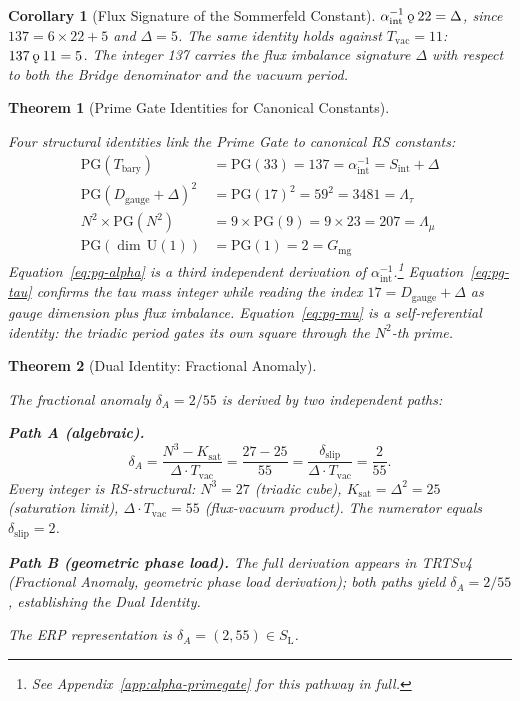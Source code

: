 \documentclass[11pt, letterpaper]{article}
\newcommand{\SL}{S_{\mathrm{L}}}
\newcommand{\koppa}{\mathbin{\text{\rm\k{o}}}}
\newcommand{\Dg}{D_{\mathrm{gauge}}}
\newcommand{\Sint}{S_{\mathrm{int}}}
\newcommand{\PG}{\mathrm{PG}}
\theoremstyle{definition}
\theoremstyle{plain}
\newtheorem{theorem}{Theorem}[section]
\newtheorem{corollary}{Corollary}[section]
\begin{document}
\begin{corollary}[Flux Signature of the Sommerfeld Constant]
\label{cor:flux-sig}
$\alpha^{-1}_{\mathrm{int}} \koppa 22 = \Delta$, since $137=6\times 22+5$ and $\Delta=5$. The same identity holds against $T_{\mathrm{vac}}=11$: $137 \koppa 11 = 5$. The integer 137 carries the flux imbalance signature $\Delta$ with respect to both the Bridge denominator and the vacuum period.
\end{corollary}

\begin{theorem}[Prime Gate Identities for Canonical Constants]
\label{thm:pg-identities}
\begin{rsbox}
Four structural identities link the Prime Gate to canonical RS constants:
\begin{align}
\PG(T_{\mathrm{bary}}) &= \PG(33) = 137
  = \alpha^{-1}_{\mathrm{int}} = \Sint+\Delta
  \label{eq:pg-alpha}\\[4pt]
\PG(\Dg+\Delta)^2 &= \PG(17)^2 = 59^2 = 3481
  = \Lambda_\tau
  \label{eq:pg-tau}\\[4pt]
N^2\times\PG(N^2) &= 9\times\PG(9) = 9\times 23 = 207
  = \Lambda_\mu
  \label{eq:pg-mu}\\[4pt]
\PG(\dim\,\mathrm{U}(1)) &= \PG(1) = 2 = G_{\mathrm{mg}}
  \label{eq:pg-mg}
\end{align}
Equation~\eqref{eq:pg-alpha} is a third independent derivation of
$\alpha^{-1}_{\mathrm{int}}$.\footnote{See Appendix~\ref{app:alpha-primegate}
for this pathway in full.}  Equation~\eqref{eq:pg-tau} confirms the tau mass
integer while reading the index $17=\Dg+\Delta$ as gauge dimension plus flux
imbalance.  Equation~\eqref{eq:pg-mu} is a self-referential identity: the
triadic period gates its own square through the $N^2$-th prime.
\end{rsbox}
\end{theorem}

\begin{theorem}[Dual Identity: Fractional Anomaly]\label{thm:dual-anomaly}
\begin{rsbox}
The fractional anomaly $\delta_A=2/55$ is derived by two independent paths:

\textbf{Path A (algebraic).}
\[
\delta_A = \frac{N^3-K_{\mathrm{sat}}}{\Delta\cdot T_{\mathrm{vac}}}
         = \frac{27-25}{55}
         = \frac{\delta_{\mathrm{slip}}}{\Delta\cdot T_{\mathrm{vac}}}
         = \frac{2}{55}.
\]
Every integer is RS-structural: $N^3=27$ (triadic cube),
$K_{\mathrm{sat}}=\Delta^2=25$ (saturation limit),
$\Delta\cdot T_{\mathrm{vac}}=55$ (flux-vacuum product).
The numerator equals $\delta_{\mathrm{slip}}=2$.

\textbf{Path B (geometric phase load).}  The full derivation appears in
TRTSv4 (Fractional Anomaly, geometric phase load derivation); both paths
yield $\delta_A=2/55$, establishing the Dual Identity.

The ERP representation is $\delta_A=(2,55)\in\SL$.
\end{rsbox}
\end{theorem}
\end{document}
